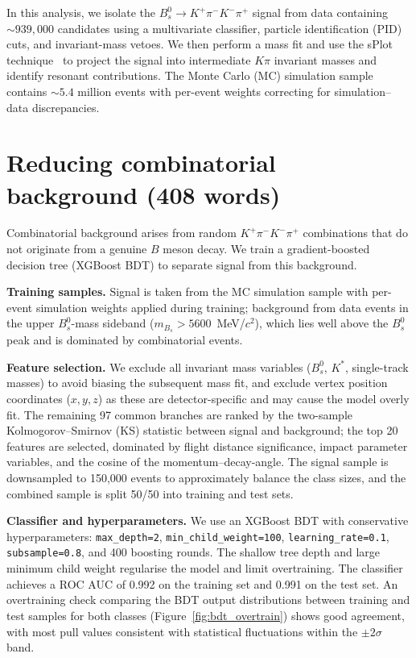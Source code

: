 \documentclass[10pt,leqno]{amsart}
\begin{document}
In this analysis, we isolate the $B_s^0 \to K^+\pi^-K^-\pi^+$ signal from data containing ${\sim}939{,}000$ candidates using a multivariate classifier, particle identification (PID) cuts, and invariant-mass vetoes. We then perform a mass fit and use the sPlot technique~\cite{splot} to project the signal into intermediate $K\pi$ invariant masses and identify resonant contributions. The Monte Carlo (MC) simulation sample contains ${\sim}5.4$ million events with per-event weights correcting for simulation--data discrepancies.


\section{Reducing combinatorial background (408 words)}

Combinatorial background arises from random $K^+\pi^-K^-\pi^+$ combinations that do not originate from a genuine $B$ meson decay. We train a gradient-boosted decision tree (XGBoost BDT) to separate signal from this background.

\textbf{Training samples.} Signal is taken from the MC simulation sample with per-event simulation weights applied during training; background from data events in the upper $B_s^0$-mass sideband ($m_{B_s} > 5600$~MeV/$c^2$), which lies well above the $B_s^0$ peak and is dominated by combinatorial events.

\textbf{Feature selection.} We exclude all invariant mass variables ($B_s^0$, $K^*$, single-track masses) to avoid biasing the subsequent mass fit, and exclude vertex position coordinates ($x, y, z$) as these are detector-specific and may cause the model overly fit. The remaining 97 common branches are ranked by the two-sample Kolmogorov--Smirnov (KS) statistic between signal and background; the top 20 features are selected, dominated by flight distance significance, impact parameter variables, and the cosine of the momentum--decay-angle. The signal sample is downsampled to 150{,}000 events to approximately balance the class sizes, and the combined sample is split 50/50 into training and test sets.

\textbf{Classifier and hyperparameters.} We use an XGBoost BDT with conservative hyperparameters: \texttt{max\_depth=2}, \texttt{min\_child\_weight=100}, \texttt{learning\_rate=0.1}, \texttt{subsample=0.8}, and 400 boosting rounds. The shallow tree depth and large minimum child weight regularise the model and limit overtraining. The classifier achieves a ROC AUC of 0.992 on the training set and 0.991 on the test set. An overtraining check comparing the BDT output distributions between training and test samples for both classes (Figure~\ref{fig:bdt_overtrain}) shows good agreement, with most pull values consistent with statistical fluctuations within the $\pm 2\sigma$ band.
\end{document}

